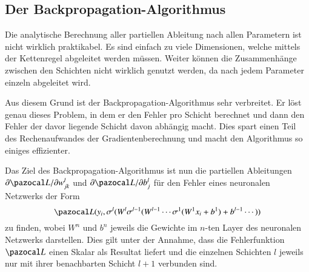 \subsection{Der Backpropagation-Algorithmus}

%
%
%
%
Die analytische Berechnung aller partiellen Ableitung nach allen Parametern 
ist nicht wirklich praktikabel.
Es sind einfach zu viele Dimensionen, welche mittels der Kettenregel
abgeleitet werden müssen.
Weiter können die Zusammenhänge zwischen
den Schichten nicht wirklich genutzt werden, da nach jedem Parameter
einzeln abgeleitet wird.

Aus diesem Grund ist der Backpropagation-Algorithmus sehr verbreitet.
Er löst genau dieses Problem, in dem er den Fehler pro Schicht berechnet und dann den Fehler der davor liegende Schicht davon abhängig macht.
Dies spart einen Teil des Rechenaufwandes der Gradientenberechnung und macht den Algorithmus so einiges effizienter.

Das Ziel des Backpropagation-Algorithmus ist nun die partiellen Ableitungen $\partial \Lb / \partial w^l_{jk}$ und $\partial \Lb / \partial b^l_j$ für den Fehler eines neuronalen Netzwerks der Form
\begin{equation}
\Lb(y_{i}, \sigma^{l}(W^{l}\sigma^{l-1}(W^{l-1}\cdots \sigma^{1}(W^{1}x_i+b^{1}) + b^{l-1} \cdots ) )
\end{equation}
zu finden, wobei $W^{n}$ und $b^{n}$ jeweils die Gewichte im $n$-ten Layer des neuronalen Netzwerks darstellen.
Dies gilt unter der Annahme, dass die Fehlerfunktion $\Lb$ einen Skalar
als Resultat liefert und die einzelnen Schichten $l$ jeweils nur mit
ihrer benachbarten Schicht $l+1$ verbunden sind.

